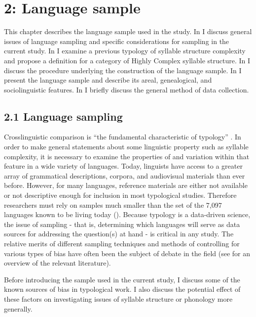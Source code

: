 \chapter{2: Language sample}

  This chapter describes the language sample used in the study. In  I discuss general issues of language sampling and specific considerations for sampling in the current study. In  I examine a previous typology of syllable structure complexity and propose a definition for a category of Highly Complex syllable structure. In  I discuss the procedure underlying the construction of the language sample. In  I present the language sample and describe its areal, genealogical, and sociolinguistic features. In  I briefly discuss the general method of data collection.

\section{2.1 Language sampling}

  Crosslinguistic comparison is “the fundamental characteristic of typology” \citep[6]{Croft2003}. In order to make general statements about some linguistic property such as syllable complexity, it is necessary to examine the properties of and variation within that feature in a wide variety of languages. Today, linguists have access to a greater array of grammatical descriptions, corpora, and audiovisual materials than ever before. However, for many languages, reference materials are either not available or not descriptive enough for inclusion in most typological studies. Therefore researchers must rely on samples much smaller than the set of the 7,097 languages known to be living today (\citealt{SimonsFennig2018}). Because typology is a data-driven science, the issue of sampling - that is, determining which languages will serve as data sources for addressing the question(s) at hand - is critical in any study. The relative merits of different sampling techniques and methods of controlling for various types of bias have often been the subject of debate in the field (see \citealt{Bakker2011} for an overview of the relevant literature). 

  Before introducing the sample used in the current study, I discuss some of the known sources of bias in typological work. I also discuss the potential effect of these factors on investigating issues of syllable structure or phonology more generally.

